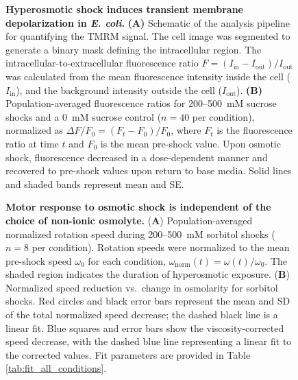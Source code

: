 \documentclass[twocolumn]{biophys-new}%
\begin{document}
\begin{figure}
    \centering
      \caption{\textbf{Hyperosmotic shock induces transient membrane depolarization in \textit{E. coli}.}  \textbf{(A)} Schematic of the analysis pipeline for quantifying the TMRM signal. The cell image was segmented to generate a binary mask defining the intracellular region. The intracellular-to-extracellular fluorescence ratio $F = (I_{\mathrm{in}} - I_{\mathrm{out}})/I_{\mathrm{out}}$ was calculated from the mean fluorescence intensity inside the cell ($I_{\mathrm{in}}$), and the background intensity outside the cell ($I_{\mathrm{out}}$). \textbf{(B)} Population-averaged fluorescence ratios for 200--500~mM sucrose shocks and a 0~mM sucrose control ($n = 40$ per condition), normalized as $\Delta F/F_{0} = (F_{t} - F_{0})/F_{0}$, where $F_{t}$ is the fluorescence ratio at time $t$ and $F_{0}$ is the mean pre-shock value. Upon osmotic shock, fluorescence decreased in a dose-dependent manner and recovered to pre-shock values upon return to base media. Solid lines and shaded bands represent mean and SE.}
    \label{fig:TMRM}
\end{figure}


\begin{figure}
    \centering
    \caption{\textbf{Motor response to osmotic shock is independent of the choice of non-ionic osmolyte.}
    (\textbf{A}) Population-averaged normalized rotation speed during 200--500~mM sorbitol shocks ($n= 8$ per condition). Rotation speeds were normalized to the mean pre-shock speed $\omega_{\mathrm{0}}$ for each condition, $\omega_{\mathrm{norm}}(t) = \omega(t)/\omega_{\mathrm{0}}$. The shaded region indicates the duration of hyperosmotic exposure. 
    (\textbf{B}) Normalized speed reduction vs.\ change in osmolarity for sorbitol shocks. Red circles and black error bars represent the mean and SD of the total normalized speed decrease; the dashed black line is a linear fit. Blue squares and error bars show the viscosity-corrected speed decrease, with the dashed blue line representing a linear fit to the corrected values. Fit parameters are provided in Table \ref{tab:fit_all_conditions}.}
    \label{fig:sorb_MB_shocks}
\end{figure}
\end{document}
